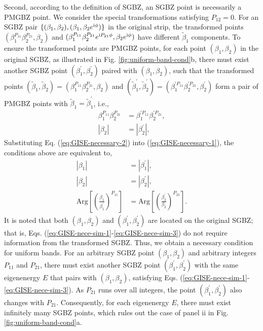Second, according to the definition of SGBZ, an SGBZ point is necessarily
a PMGBZ point. We consider the special transformations satisfying
$P_{12}=0$. For an SGBZ pair $\{(\beta_{1},\beta_{2}),(\beta_{1},\beta_{2}e^{\mathrm{i}\phi})\}$
in the original strip, the transformed points $(\beta_{1}^{P_{11}}\beta_{2}^{P_{21}},\beta_{2})$
and $(\beta_{1}^{P_{11}}\beta_{2}^{P_{21}}e^{\mathrm{i} P_{21}\phi},\beta_{2}e^{\mathrm{i}\phi})$
have different $\tilde{\beta}_{1}$ components. To ensure the transformed
points are PMGBZ points, for each point $(\beta_{1},\beta_{2})$ in
the original SGBZ, as illustrated in Fig. \ref{fig:uniform-band-cond}b,
there must exist another SGBZ point $(\beta_{1}^{\prime},\beta_{2}^{\prime})$
paired with $(\beta_{1},\beta_{2})$, such that the transformed points
$\left(\tilde{\beta}_{1},\tilde{\beta}_{2}\right)=\left(\beta_{1}^{P_{11}}\beta_{2}^{P_{21}},\beta_{2}\right)$
and $\left(\tilde{\beta}_{1}^{\prime},\tilde{\beta}_{2}^{\prime}\right)=\left(\beta_{1}^{\prime P_{11}}\beta_{2}^{\prime P_{21}},\beta_{2}^{\prime}\right)$
form a pair of PMGBZ points with $\tilde{\beta}_{1}=\tilde{\beta}_{1}^{\prime}$,
i.e., 
\begin{align}
\beta_{1}^{P_{11}}\beta_{2}^{P_{21}} & =\beta_{1}^{\prime P_{11}}\beta_{2}^{\prime P_{21}},\label{eq:GISE-necessary-1}\\
\left|\beta_{2}\right| & =\left|\beta_{2}^{\prime}\right|,\label{eq:GISE-necessary-2}
\end{align}
Substituting Eq. (\ref{eq:GISE-necessary-2}) into (\ref{eq:GISE-necessary-1}),
the conditions above are equivalent to, 
\begin{align}
\left|\beta_{1}\right| & =\left|\beta_{1}^{\prime}\right|,\label{eq:GISE-nece-sim-1}\\
\left|\beta_{2}\right| & =\left|\beta_{2}^{\prime}\right|,\label{eq:GISE-nece-sim-2}\\
\text{Arg}\left[\left(\frac{\beta_{1}}{\beta_{1}^{\prime}}\right)^{P_{11}}\right] & =\text{Arg}\left[\left(\frac{\beta_{2}^{\prime}}{\beta_{2}}\right)^{P_{21}}\right].\label{eq:GISE-nece-sim-3}
\end{align}
It is noted that both $(\beta_{1},\beta_{2})$ and $(\beta_{1}^{\prime},\beta_{2}^{\prime})$
are located on the original SGBZ; that is, Eqs. (\ref{eq:GISE-nece-sim-1}-\ref{eq:GISE-nece-sim-3})
do not require information from the transformed SGBZ. Thus, we obtain
a necessary condition for uniform bands. For an arbitrary SGBZ point
$(\beta_{1},\beta_{2})$ and arbitrary integers $P_{11}$ and $P_{21}$,
there must exist another SGBZ point $(\beta_{1}^{\prime},\beta_{2}^{\prime})$
with the same eigenenergy $E$ that pairs with $(\beta_{1},\beta_{2})$,
satisfying Eqs. (\ref{eq:GISE-nece-sim-1}-\ref{eq:GISE-nece-sim-3}).
As $P_{21}$ runs over all integers, the point $(\beta_{1}^{\prime},\beta_{2}^{\prime})$
also changes with $P_{21}$. Consequently, for each eigenenergy $E$,
there must exist infinitely many SGBZ points, which rules out the
case of panel ii in Fig. \ref{fig:uniform-band-cond}a.


